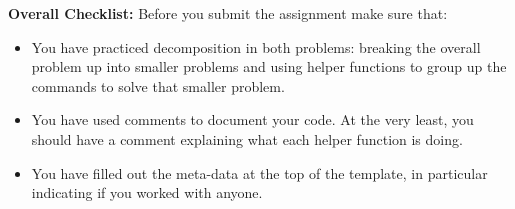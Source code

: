 \documentclass[letterpaper,12pt]{exam}
\begin{document}
\begin{questions}
	\bigskip
	\textbf{Overall Checklist:}
	Before you submit the assignment make sure that:
	\begin{itemize}
		\item[$\square$] You have practiced decomposition in both problems: breaking the overall problem up into smaller problems and using helper functions to group up the commands to solve that smaller problem.
		\item[$\square$] You have used comments to document your code. At the very least, you should have a comment explaining what each helper function is doing.
		\item[$\square$] You have filled out the meta-data at the top of the template, in particular indicating if you worked with anyone.
	\end{itemize}
	
	
\end{questions}
\end{document}
